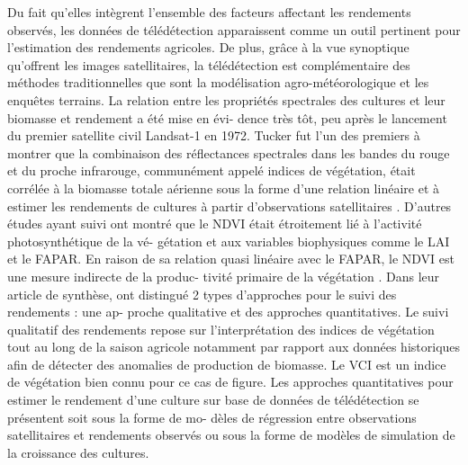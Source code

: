 Du fait qu’elles intègrent l’ensemble des facteurs affectant les rendements observés,
les données de télédétection apparaissent comme un outil pertinent pour l’estimation
des rendements agricoles. De plus, grâce à la vue synoptique qu’offrent les images satellitaires, la télédétection est complémentaire des méthodes traditionnelles que sont
la modélisation agro-météorologique et les enquêtes terrains. La relation entre les propriétés spectrales des cultures et leur biomasse et rendement a été mise en évi-
dence très tôt, peu après le lancement du premier satellite civil Landsat-1 en 1972.
Tucker fut l’un des premiers à montrer que la combinaison des réflectances spectrales
dans les bandes du rouge et du proche infrarouge, communément appelé indices de
végétation, était corrélée à la biomasse totale aérienne sous la forme d’une relation
linéaire \citep{Tucker1979} et à estimer les rendements de cultures à partir d’observations
satellitaires \citep{Tucker1981, Tucker1986}. D’autres études ayant suivi
ont montré que le NDVI était étroitement lié à l’activité photosynthétique de la vé-
gétation et aux variables biophysiques comme le LAI et le FAPAR. En raison de sa
relation quasi linéaire avec le FAPAR, le NDVI est une mesure indirecte de la produc-
tivité primaire de la végétation \citep{Prince1990}. Dans leur article de synthèse, \citep{Rembold2013} ont distingué 2 types d’approches pour le suivi des rendements : une ap-
proche qualitative et des approches quantitatives. Le suivi qualitatif des rendements
repose sur l’interprétation des indices de végétation tout au long de la saison agricole
notamment par rapport aux données historiques afin de détecter des anomalies de
production de biomasse. Le VCI \citep{Kogan1995} est un indice de végétation bien connu
pour ce cas de figure. Les approches quantitatives pour estimer le rendement d’une
culture sur base de données de télédétection se présentent soit sous la forme de mo-
dèles de régression entre observations satellitaires et rendements observés ou sous la
forme de modèles de simulation de la croissance des cultures.

